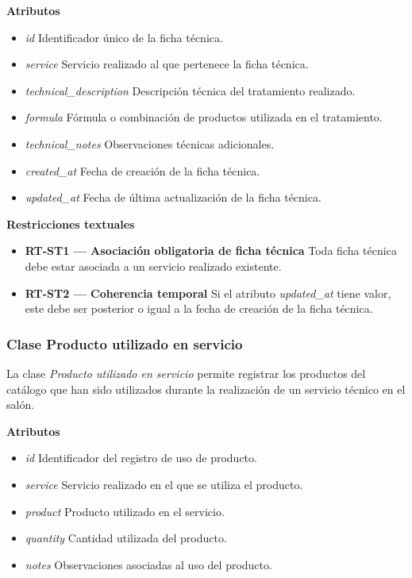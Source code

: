 \textbf{Atributos}

\begin{itemize}

      \item \textit{id}
            Identificador único de la ficha técnica.
      \item \textit{service}
            Servicio realizado al que pertenece la ficha técnica.
      \item \textit{technical\_description}
            Descripción técnica del tratamiento realizado.
      \item \textit{formula}
            Fórmula o combinación de productos utilizada en el tratamiento.
      \item \textit{technical\_notes}
            Observaciones técnicas adicionales.
      \item \textit{created\_at}
            Fecha de creación de la ficha técnica.
      \item \textit{updated\_at}
            Fecha de última actualización de la ficha técnica.

\end{itemize}

\textbf{Restricciones textuales}

\begin{itemize}

      \item \textbf{RT-ST1 — Asociación obligatoria de ficha técnica}
            Toda ficha técnica debe estar asociada a un servicio realizado existente.
      \item \textbf{RT-ST2 — Coherencia temporal}
            Si el atributo \textit{updated\_at} tiene valor, este debe ser posterior o igual a la fecha de creación de la ficha técnica.

\end{itemize}

\subsubsection{Clase Producto utilizado en servicio}

La clase \textit{Producto utilizado en servicio} permite registrar los productos del catálogo que han sido utilizados durante la realización de un servicio técnico en el salón.

\textbf{Atributos}

\begin{itemize}

      \item \textit{id}
            Identificador del registro de uso de producto.
      \item \textit{service}
            Servicio realizado en el que se utiliza el producto.
      \item \textit{product}
            Producto utilizado en el servicio.
      \item \textit{quantity}
            Cantidad utilizada del producto.
      \item \textit{notes}
            Observaciones asociadas al uso del producto.

\end{itemize}

